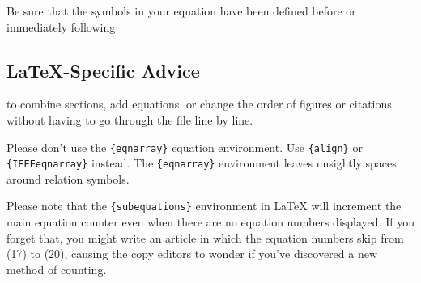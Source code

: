 \documentclass[12pt]{article}
\begin{document}
Be sure that the
symbols in your equation have been defined before or immediately following


\subsection{\LaTeX-Specific Advice}


to combine sections, add equations, or change the order of figures or
citations without having to go through the file line by line.

Please don't use the \verb|{eqnarray}| equation environment. Use
\verb|{align}| or \verb|{IEEEeqnarray}| instead. The \verb|{eqnarray}|
environment leaves unsightly spaces around relation symbols.

Please note that the \verb|{subequations}| environment in {\LaTeX}
will increment the main equation counter even when there are no
equation numbers displayed. If you forget that, you might write an
article in which the equation numbers skip from (17) to (20), causing
the copy editors to wonder if you've discovered a new method of
counting.
\printbibliography[heading=bibintoc]
\end{document}
